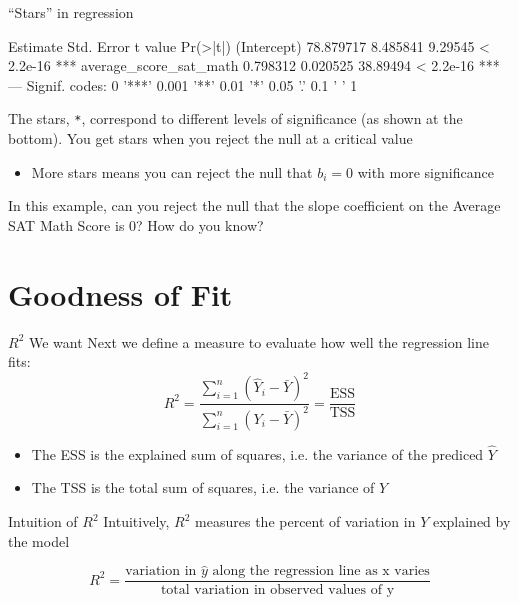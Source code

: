 \documentclass[aspectratio=169,t,11pt,table]{beamer}
\begin{document}
\begin{frame}[fragile]{``Stars'' in regression}
  \vspace*{-\bigskipamount}
  \begin{codeblock}[{}]
                        Estimate Std. Error  t value  Pr(>|t|)
(Intercept)            78.879717   8.485841  9.29545 < 2.2e-16 ***
average_score_sat_math  0.798312   0.020525 38.89494 < 2.2e-16 ***
---
Signif. codes:  0 '***' 0.001 '**' 0.01 '*' 0.05 '.' 0.1 ' ' 1
  \end{codeblock}

  \bigskip
  The stars, \texttt{*}, correspond to different levels of significance (as shown at the bottom). You get stars when you reject the null at a critical value
  \begin{itemize}
    \item More stars means you can reject the null that $b_i = 0$ with more significance
  \end{itemize}

  \bigskip
  In this example, can you reject the null that the slope coefficient on the Average SAT Math Score is 0? How do you know?
\end{frame}



\section{Goodness of Fit}

\begin{frame}{$R^2$}
  We want 
  Next we define a measure to evaluate how well the regression line fits:
  $$
    R^2 = \frac{\sum_{i=1}^n (\hat{Y}_i - \bar{Y})^2}{\sum_{i=1}^n (Y_i - \bar{Y})^2} = \frac{\text{ESS}}{\text{TSS}}
  $$
  \begin{itemize}
    \item The ESS is the \alert{explained sum of squares}, i.e. the variance of the prediced $\hat{Y}$
    \item The TSS is the \alert{total sum of squares}, i.e. the variance of $Y$
  \end{itemize}
\end{frame}

\begin{frame}{Intuition of $R^2$}
  Intuitively, $R^2$ measures the percent of variation in $Y$ explained by the model
  
  $$
    R^2 = \frac{
      \text{variation in } \hat{y} \text{ along the regression line as x varies}
    }{
      \text{total variation in observed values of y}
    }
  $$
\end{frame}
\end{document}
